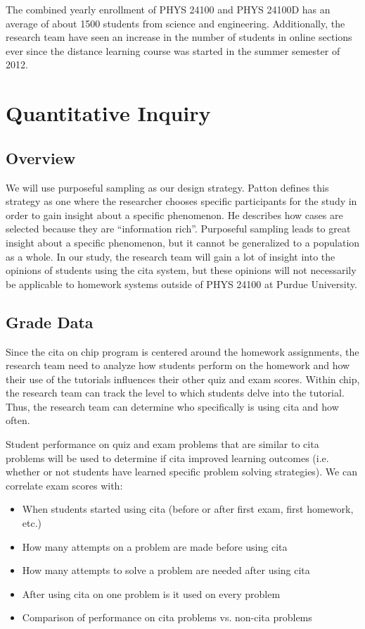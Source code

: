 The combined yearly enrollment of PHYS 24100 and PHYS 24100D has an average of about 1500 students from science and engineering. Additionally, the research team have seen an increase in the number of students in online sections ever since the distance learning course was started in the summer semester of 2012.

\section{Quantitative Inquiry}

\subsection{Overview}

We will use purposeful sampling as our design strategy. Patton defines this strategy as one where the researcher chooses specific participants for the study in order to gain insight about a specific phenomenon. He describes how cases are selected because they are ``information rich''. Purposeful sampling leads to great insight about a specific phenomenon, but it cannot be generalized to a population as a whole\cite{patton2015}. In our study, the research team will gain a lot of insight into the opinions of students using the \gls{cita} system, but these opinions will not necessarily be applicable to homework systems outside of PHYS 24100 at Purdue University.

\subsection{Grade Data}

Since the \gls{cita} on \gls{chip} program is centered around the homework assignments, the research team need to analyze how students perform on the homework and how their use of the tutorials influences their other quiz and exam scores. Within \gls{chip}, the research team can track the level to which students delve into the tutorial. Thus, the research team can determine who specifically is using \gls{cita} and how often.

Student performance on quiz and exam problems that are similar to \gls{cita} problems will be used to determine if \gls{cita} improved learning outcomes (i.e. whether or not students have learned specific problem solving strategies). We can correlate exam scores with:

\begin{itemize}
\item When students started using \gls{cita} (before or after first exam, first homework, etc.)
\item How many attempts on a problem are made before using \gls{cita}
\item How many attempts to solve a problem are needed after using \gls{cita}
\item After using \gls{cita} on one problem is it used on every problem
\item Comparison of performance on \gls{cita} problems vs. non-\gls{cita} problems
\end{itemize}

